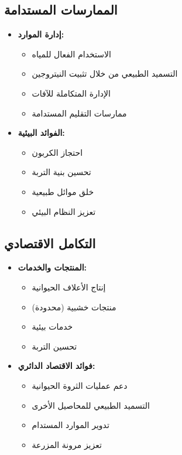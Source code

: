 \subsection{الممارسات المستدامة}
\begin{itemize}
    \item \textbf{إدارة الموارد:}
    \begin{itemize}
        \item الاستخدام الفعال للمياه
        \item التسميد الطبيعي من خلال تثبيت النيتروجين
        \item الإدارة المتكاملة للآفات
        \item ممارسات التقليم المستدامة
    \end{itemize}
    
    \item \textbf{الفوائد البيئية:}
    \begin{itemize}
        \item احتجاز الكربون
        \item تحسين بنية التربة
        \item خلق موائل طبيعية
        \item تعزيز النظام البيئي
    \end{itemize}
\end{itemize}

\subsection{التكامل الاقتصادي}
\begin{itemize}
    \item \textbf{المنتجات والخدمات:}
    \begin{itemize}
        \item إنتاج الأعلاف الحيوانية
        \item منتجات خشبية (محدودة)
        \item خدمات بيئية
        \item تحسين التربة
    \end{itemize}
    
    \item \textbf{فوائد الاقتصاد الدائري:}
    \begin{itemize}
        \item دعم عمليات الثروة الحيوانية
        \item التسميد الطبيعي للمحاصيل الأخرى
        \item تدوير الموارد المستدام
        \item تعزيز مرونة المزرعة
    \end{itemize}
\end{itemize}
